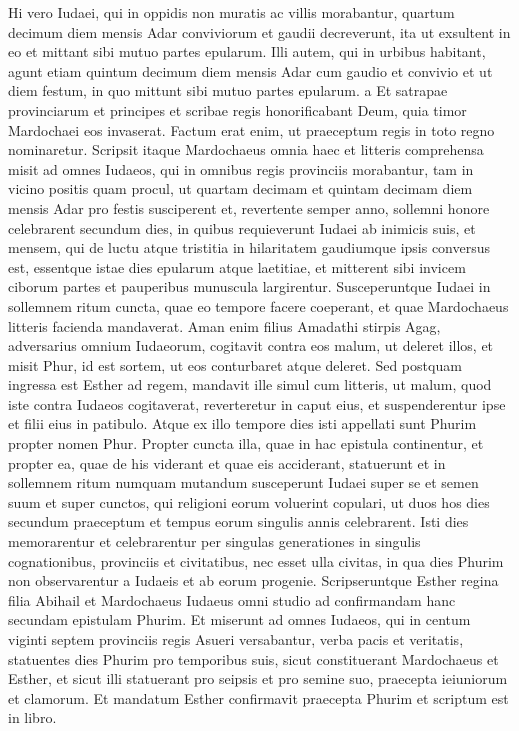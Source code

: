 \begin{biblechapter}
\verse Hi vero Iudaei, qui in oppidis non muratis ac villis morabantur, quartum decimum diem mensis Adar conviviorum et gaudii decreverunt, ita ut exsultent in eo et mittant sibi mutuo partes epularum. Illi autem, qui in urbibus habitant, agunt etiam quintum decimum diem mensis Adar cum gaudio et convivio et ut diem festum, in quo mittunt sibi mutuo partes epularum. 
\verse a Et satrapae provinciarum et principes et scribae regis honorificabant Deum, quia timor Mardochaei eos invaserat. Factum erat enim, ut praeceptum regis in toto regno nominaretur. 
\verse Scripsit itaque Mardochaeus omnia haec et litteris comprehensa misit ad omnes Iudaeos, qui in omnibus regis provinciis morabantur, tam in vicino positis quam procul, 
\verse ut quartam decimam et quintam decimam diem mensis Adar pro festis susciperent et, revertente semper anno, sollemni honore celebrarent 
\verse secundum dies, in quibus requieverunt Iudaei ab inimicis suis, et mensem, qui de luctu atque tristitia in hilaritatem gaudiumque ipsis conversus est, essentque istae dies epularum atque laetitiae, et mitterent sibi invicem ciborum partes et pauperibus munuscula largirentur. 
\verse Susceperuntque Iudaei in sollemnem ritum cuncta, quae eo tempore facere coeperant, et quae Mardochaeus litteris facienda mandaverat. 
\verse Aman enim filius Amadathi stirpis Agag, adversarius omnium Iudaeorum, cogitavit contra eos malum, ut deleret illos, et misit Phur, id est sortem, ut eos conturbaret atque deleret. 
\verse Sed postquam ingressa est Esther ad regem, mandavit ille simul cum litteris, ut malum, quod iste contra Iudaeos cogitaverat, reverteretur in caput eius, et suspenderentur ipse et filii eius in patibulo. 
\verse Atque ex illo tempore dies isti appellati sunt Phurim propter nomen Phur. Propter cuncta illa, quae in hac epistula continentur, 
\verse et propter ea, quae de his viderant et quae eis acciderant, statuerunt et in sollemnem ritum numquam mutandum susceperunt Iudaei super se et semen suum et super cunctos, qui religioni eorum voluerint copulari, ut duos hos dies secundum praeceptum et tempus eorum singulis annis celebrarent. 
\verse Isti dies memorarentur et celebrarentur per singulas generationes in singulis cognationibus, provinciis et civitatibus, nec esset ulla civitas, in qua dies Phurim non observarentur a Iudaeis et ab eorum progenie. 
\verse Scripseruntque Esther regina filia Abihail et Mardochaeus Iudaeus omni studio ad confirmandam hanc secundam epistulam Phurim. 
\verse Et miserunt ad omnes Iudaeos, qui in centum viginti septem provinciis regis Asueri versabantur, verba pacis et veritatis, 
\verse statuentes dies Phurim pro temporibus suis, sicut constituerant Mardochaeus et Esther, et sicut illi statuerant pro seipsis et pro semine suo, praecepta ieiuniorum et clamorum. 
\verse Et mandatum Esther confirmavit praecepta Phurim et scriptum est in libro. 
\end{biblechapter}


